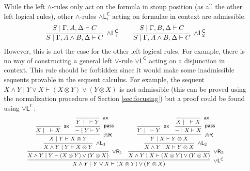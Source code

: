 \documentclass[submission,copyright,creativecommons]{eptcs}
\theoremstyle{definition}
\newcommand{\tr}{\otimes \mathsf{R}}
\newcommand{\pass}{\mathsf{pass}}
\newcommand{\andlone}{\land \mathsf{L}_{1}}
\newcommand{\andltwo}{\land \mathsf{L}_{2}}
\newcommand{\andli}{\land \mathsf{L}_{i}}
\newcommand{\orl}{\lor \mathsf{L}}
\newcommand{\orrone}{\lor \mathsf{R}_{1}}
\newcommand{\orrtwo}{\lor \mathsf{R}_{2}}
\newcommand{\ax}{\mathsf{ax}}
\newcommand{\ot}{\otimes}
\newcommand{\proofbox}[1]{\begin{tabular}{l} #1 \end{tabular}}
\begin{document}
While the left $\land$-rules only act on the formula in stoup position (as all the other left logical rules), other $\land$-rules $\andli^{\mathsf{C}}$ acting on formulae in context are admissible.
  \begin{displaymath}
    \begin{array}{c}
      \proofbox{
        \infer[\andlone^{\mathsf{C}}]{S \mid \Gamma , A \land B , \Delta \vdash C}{
          S \mid \Gamma , A ,\Delta \vdash C
        }
      }
      \quad
      \proofbox{
        \infer[\andltwo^{\mathsf{C}}]{S \mid \Gamma , A \land B , \Delta \vdash C}{
          S \mid \Gamma , B ,\Delta \vdash C
        }
      }
    \end{array}
  \end{displaymath}
However, this is not the case for the other left logical rules. For example, there is no way of constructing a general left $\lor$-rule $\orl^{\mathsf{C}}$ acting on a disjunction in context. This rule should be forbidden since it would make some inadmissible sequents provable in the sequent calculus. 
For example, the sequent $X \land Y \mid Y \lor X \vdash (X \ot Y) \lor (Y \ot X)$ is not admissible (this can be proved using the normalization procedure of Section \ref{sec:focusing}) but a proof could be found using $\orl^{\mathsf{C}}$:
\begin{displaymath}
  \footnotesize
  \begin{array}{c}
  \infer[\orl^{\mathsf{C}}]{X \land Y \mid Y \lor X \vdash (X \ot Y) \lor (Y \ot X)}{
    \infer[\orrone]{X \land Y \mid Y \vdash (X \ot Y) \lor (Y \ot X)}{
      \infer[\andlone]{X \land Y \mid Y \vdash X \ot Y}{
        \infer[\tr]{X \mid Y \vdash X \ot Y}{
          \infer[\ax]{X \mid \quad \vdash X}{}
          &
          \infer[\pass]{- \mid Y \vdash Y}{
            \infer[\ax]{Y \mid \quad \vdash Y}{}
          }
        }
      }
    }
    &
    \infer[\orrtwo]{X \land Y \mid X \vdash (X \ot Y) \lor (Y \ot X)}{
      \infer[\andltwo]{X \land Y \mid X \vdash Y \ot X}{
        \infer[\tr]{Y \mid X \vdash Y \ot X}{
          \infer[\ax]{Y \mid \quad \vdash Y}{}
          &
          \infer[\pass]{- \mid X \vdash X}{
            \infer[\ax]{X \mid \quad \vdash X}{}
          }
        }
      }
    }
  }
  \end{array}
\end{displaymath}
\end{document}
